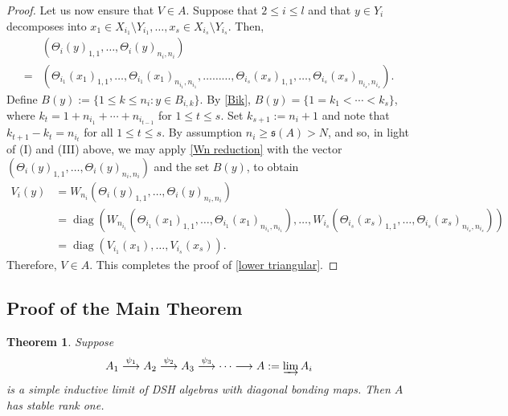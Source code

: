 \documentclass[12pt]{amsart}
\numberwithin{equation}{section}
\newtheorem{theorem}{Theorem}[section]
\theoremstyle{definition}
\theoremstyle{remark}
\newcommand{\diag}{\operatorname{diag}}
\begin{document}
\begin{proof}
	Let us now ensure that $V\in A$. Suppose that $2\leq i\leq  l $ and that $y\in Y_{i}$ decomposes into $x_{1}\in X_{i_{1}}\setminus Y_{i_{1}},\ldots,x_{s}\in X_{i_{s}}\setminus Y_{i_{s}}$. Then,
	$$
	\begin{aligned}
	&(\Theta_{i}(y)_{1,1},\ldots,\Theta_{i}(y)_{n_{i},n_{i}})\\
	=&(\Theta_{i_{1}}(x_{1})_{1,1},\ldots,\Theta_{i_{1}}(x_{1})_{n_{i_{1}},n_{i_{1}}},\ldots\ldots\ldots,\Theta_{i_{s}}(x_{s})_{1,1},\ldots,\Theta_{i_{s}}(x_{s})_{n_{i_{s}},n_{i_{s}}}).
	\end{aligned}
	$$
	Define $B(y):=\{1\leq k\leq n_{i}:y\in B_{i,k}\}$. By \autoref{Bik}, $B(y)=\{1=k_{1}<\cdots<k_{s}\}$, where $k_{t}= 1+n_{i_{1}}+\cdots+n_{i_{t-1}}$ for $1\leq t\leq s$. Set $k_{s+1}:=n_{i}+1$ and note that $k_{t+1}-k_{t}=n_{i_{t}}$ for all $1\leq t\leq s$. By assumption $n_{i}\geq\mathfrak{s}(A)>N$, and so, in light of (I) and (III) above, we may apply \autoref{Wn reduction} with the vector $(\Theta_{i}(y)_{1,1},\ldots,\Theta_{i}(y)_{n_{i},n_{i}})$ and the set $B(y)$, to obtain
	$$
	\begin{aligned}
	V_{i}(y)&=W_{n_{i}}(\Theta_{i}(y)_{1,1},\ldots,\Theta_{i}(y)_{n_{i},n_{i}})\\	&=\diag\left(W_{n_{i_{1}}}(\Theta_{i_{1}}(x_{1})_{1,1},\ldots,\Theta_{i_{1}}(x_{1})_{n_{i_{1}},n_{i_{1}}}),\ldots,W_{i_{s}}(\Theta_{i_{s}}(x_{s})_{1,1},\ldots,\Theta_{i_{s}}(x_{s})_{n_{i_{s}},n_{i_{s}}})\right)\\	&=\diag(V_{i_{1}}(x_{1}),\ldots,V_{i_{s}}(x_{s})).
	\end{aligned}
	$$
	Therefore, $V\in A$. This completes the proof of \autoref{lower triangular}.
\end{proof}










\subsection{Proof of the Main Theorem}
\label{sc: main proof}

\begin{theorem}
	\label{main}
	Suppose 
	$$
	A_{1}\overset{\psi_{1}}{\longrightarrow} A_{2}\overset{\psi_{2}}{\longrightarrow} A_{3}\overset{\psi_{3}}{\longrightarrow}\cdots\longrightarrow A:=\varinjlim A_{i}
	$$
	is a simple inductive limit of DSH algebras with diagonal bonding maps. Then $A$ has stable rank one. 	
\end{theorem}
\end{document}
